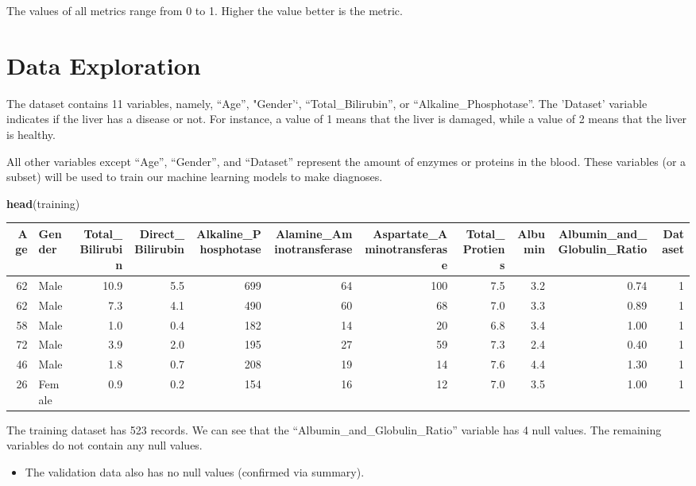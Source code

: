 \documentclass[]{article}
\newenvironment{Shaded}{\begin{snugshade}}{\end{snugshade}}
\newcommand{\KeywordTok}[1]{\textcolor[rgb]{0.13,0.29,0.53}{\textbf{#1}}}
\newcommand{\NormalTok}[1]{#1}
\begin{document}
The values of all metrics range from 0 to 1. Higher the value better is
the metric.

\section{Data Exploration}
\label{sec:exploration}

The dataset contains 11 variables, namely, ``Age'', "Gender'`,
``Total\_Bilirubin'', or ``Alkaline\_Phosphotase''. The 'Dataset'
variable indicates if the liver has a disease or not. For instance, a
value of 1 means that the liver is damaged, while a value of 2 means
that the liver is healthy.

All other variables except ``Age'', ``Gender'', and ``Dataset''
represent the amount of enzymes or proteins in the blood. These
variables (or a subset) will be used to train our machine learning
models to make diagnoses.

\begin{Shaded}
\begin{Highlighting}[]
\KeywordTok{head}\NormalTok{(training)}
\end{Highlighting}
\end{Shaded}

\begin{longtable}[]{@{}rlrrrrrrrrr@{}}
\toprule
Age & Gender & Total\_Bilirubin & Direct\_Bilirubin &
Alkaline\_Phosphotase & Alamine\_Aminotransferase &
Aspartate\_Aminotransferase & Total\_Protiens & Albumin &
Albumin\_and\_Globulin\_Ratio & Dataset\tabularnewline
\midrule
\endhead
62 & Male & 10.9 & 5.5 & 699 & 64 & 100 & 7.5 & 3.2 & 0.74 &
1\tabularnewline
62 & Male & 7.3 & 4.1 & 490 & 60 & 68 & 7.0 & 3.3 & 0.89 &
1\tabularnewline
58 & Male & 1.0 & 0.4 & 182 & 14 & 20 & 6.8 & 3.4 & 1.00 &
1\tabularnewline
72 & Male & 3.9 & 2.0 & 195 & 27 & 59 & 7.3 & 2.4 & 0.40 &
1\tabularnewline
46 & Male & 1.8 & 0.7 & 208 & 19 & 14 & 7.6 & 4.4 & 1.30 &
1\tabularnewline
26 & Female & 0.9 & 0.2 & 154 & 16 & 12 & 7.0 & 3.5 & 1.00 &
1\tabularnewline
\bottomrule
\end{longtable}

The training dataset has 523 records. We can see that the
``Albumin\_and\_Globulin\_Ratio'' variable has 4 null values. The
remaining variables do not contain any null values.

\begin{itemize}
\item The validation data also has no null values (confirmed via summary).
\end{itemize}
\end{document}
